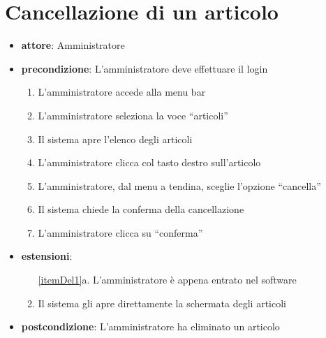 \section{Cancellazione di un articolo}
\begin{itemize}
	\item \textbf{attore}: Amministratore
	\item \textbf{precondizione}: L’amministratore deve effettuare il login
	
	\begin{enumerate}
		\item L’amministratore accede alla menu bar
		\label{itemDel1}
		\item L’amministratore seleziona la voce “articoli”
		\item Il sistema apre l’elenco degli articoli
		\item L’amministratore clicca col tasto destro sull’articolo
		\item L’amministratore, dal menu a tendina, sceglie l’opzione “cancella”
		\item Il sistema chiede la conferma della cancellazione
		\item L’amministratore clicca su “conferma”
	\end{enumerate}

	\item \textbf{estensioni}:
	\begin{enumerate}
		\item[\ref{itemDel1}a.] L’amministratore è appena entrato nel software
		\item Il sistema gli apre direttamente la schermata degli articoli
	\end{enumerate}

	\item \textbf{postcondizione}: L’amministratore ha eliminato un articolo
\end{itemize}

		

